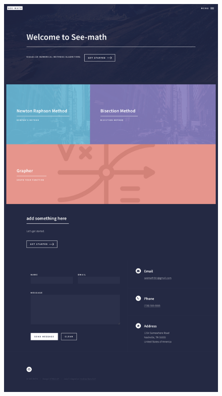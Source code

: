 \documentclass[12pt]{beamer}
\begin{document}
\begin{frame}{}
\begin{minipage}{0.7\linewidth}
\begin{figure}
	\centering
	\includegraphics[width=\linewidth]{seemath1}
	\caption{}
	\label{fig:seemath1}
\end{figure}

\end{minipage}
	

		
	\end{frame}
	
	
	
\end{document}
